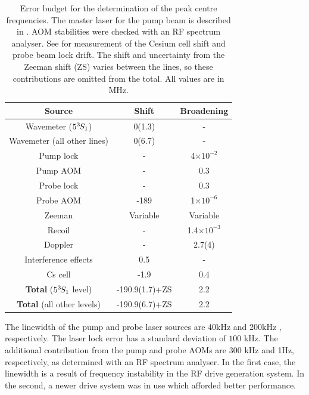 \begin{table}
\centering
  \begin{tabular}{c c c}
      \hline\hline
          Source & Shift & Broadening  \\
      \hline
          Wavemeter ($5^{3\!} S_1$)& 0(1.3) & - \\
          Wavemeter (all other lines)& 0(6.7) & - \\
          Pump lock & - & 4$\times10^{-2}$ \\
          Pump AOM & - & 0.3 \\
          Probe lock & - & 0.3\\
          Probe AOM & -189 & 1$\times10^{-6}$\\
          Zeeman & Variable & Variable \\
          Recoil & - & 1.4$\times 10^{-3}$ \\ %
          Doppler & - & 2.7(4) \\
          Interference effects & 0.5 & - \\ 
          Cs cell & -1.9 & 0.4 \\
          \textbf{Total} ($5^{3\!} S_1$ level) & -190.9(1.7)+ZS& 2.2\\
          \textbf{Total} (all other levels) & -190.9(6.7)+ZS& 2.2\\
      \hline\hline
  \end{tabular}
\caption{Error budget for the determination of the peak centre frequencies.
	 The master laser for the pump beam is described in \cite{Shin16}.
	AOM stabilities were checked with an RF spectrum analyser.
	See \cite{Thomas20} for measurement of the Cesium cell shift and probe beam lock drift.
	The shift and uncertainty from the Zeeman shift (ZS) varies between the lines, so these contributions are omitted from the total.
	All values are in MHz.}
  \label{tab:errors}
  
\end{table}

	The linewidth of the pump and probe laser sources are 40kHz \cite{Shin16} and 200kHz \cite{Thomas20}, respectively.
	The laser lock error has a standard deviation of $100$ kHz.
	The additional contribution from the pump and probe AOMs are 300 kHz and 1Hz, respectively, as determined with an RF spectrum analyser.
	In the first case, the linewidth is a result of frequency instability in the RF drive generation system. In the second, a newer drive system was in use which afforded better performance.
	

